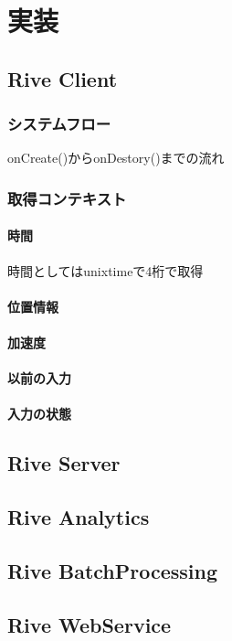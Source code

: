 \chapter{実装}
\label{implementation}

\section{Rive Client}
\subsection{システムフロー}
onCreate()からonDestory()までの流れ

\subsection{取得コンテキスト}
\subsubsection{時間}
時間としてはunixtimeで4桁で取得
\subsubsection{位置情報}
\subsubsection{加速度}
\subsubsection{以前の入力}
\subsubsection{入力の状態}



\subsection{}

\section{Rive Server}

\section{Rive Analytics}

\section{Rive BatchProcessing}

\section{Rive WebService}
